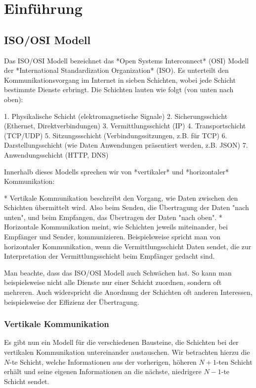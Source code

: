 \documentclass[a4paper,11pt]{scrartcl}
\begin{document}
\section{Einführung}

\subsection{ISO/OSI Modell}

Das ISO/OSI Modell bezeichnet das *Open Systems Interconnect* (OSI) Modell der
*International Standardization Organization* (ISO). Es unterteilt den
Kommunikationsvorgang im Internet in sieben Schichten, wobei jede Schicht
bestimmte Dienste erbringt. Die Schichten lauten wie folgt (von unten nach oben):

1. Physikalische Schicht (elektromagnetische Signale)
2. Sicherungsschicht (Ethernet, Direktverbindungen)
3. Vermittlungsschicht (IP)
4. Transportschicht (TCP/UDP)
5. Sitzungssschicht (Verbindungssitzungen, z.B. für TCP)
6. Darstellungsschicht (wie Daten Anwendungen präsentiert werden, z.B. JSON)
7. Anwendungsschicht (HTTP, DNS)

Innerhalb dieses Modells sprechen wir von *vertikaler* und *horizontaler*
Kommunikation:

* Vertikale Kommunikation beschreibt den Vorgang, wie Daten zwischen den
  Schichten übermittelt wird. Also beim Senden, die Übertragung der Daten "nach
  unten", und beim Empfangen, das Übertragen der Daten "nach oben".
* Horizontale Kommunikation meint, wie Schichten jeweils miteinander, bei
  Empfänger und Sender, kommunizieren. Beispielsweise spricht man von
  horizontaler Kommunikation, wenn die Vermittlungsschicht Daten sendet, die
  zur Interpretation der Vermittlungsschicht beim Empfänger gedacht sind.

Man beachte, dass das ISO/OSI Modell auch Schwächen hat. So kann man
beispielsweise nicht alle Dienste nur einer Schicht zuordnen, sondern oft
mehreren. Auch widerspricht die Anordnung der Schichten oft anderen Interessen,
beispielsweise der Effizienz der Übertragung.

\subsubsection{ Vertikale Kommunikation}

Es gibt nun ein Modell für die verschiedenen Bausteine, die Schichten bei der
vertikalen Kommunikation untereinander austauschen. Wir betrachten hierzu die
$N$-te Schicht, welche Informationen aus der vorherigen, höheren $N+1$-ten
Schicht erhält und seine eigenen Informationen an die nächste, niedrigere
$N-1$-te Schicht sendet.
\end{document}
